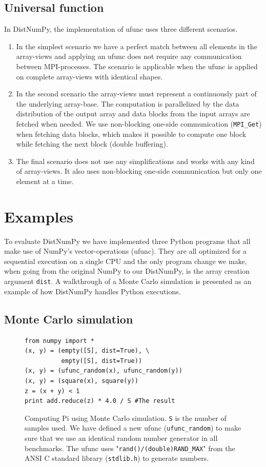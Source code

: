 \documentclass[10pt]{article}
\begin{document}
\subsection{Universal function}
In DistNumPy, the implementation of ufunc uses three different scenarios.
\begin{enumerate}
\item In the simplest scenario we have a perfect match between all elements in the array-views and applying an ufunc does not require any communication between MPI-processes. The scenario is applicable when the ufunc is applied on complete array-views with identical shapes.
\item In the second scenario the array-views must represent a continuously part of the underlying array-base. The computation is parallelized by the data distribution of the output array and data blocks from the input arrays are fetched when needed. We use non-blocking one-side communication (\texttt{MPI\_Get}) when fetching data blocks, which makes it possible to compute one block while fetching the next block (double buffering).
\item The final scenario does not use any simplifications and works with any kind of array-views. It also uses non-blocking one-side communication but only one element at a time.
\end{enumerate}


\section{Examples}
To evaluate DistNumPy we have implemented three Python programs that all make use of NumPy's vector-operations (ufunc). They are all optimized for a sequential execution on a single CPU and the only program change we make, when going from the original NumPy to our DistNumPy, is the array creation argument \texttt{dist}. 
A walkthrough of a Monte Carlo simulation is presented as an example of how DistNumPy handles Python executions.


\subsection{Monte Carlo simulation}
\begin{figure}
\begin{lstlisting}
from numpy import *
(x, y) = (empty([S], dist=True), \
		  empty([S], dist=True))
(x, y) = (ufunc_random(x), ufunc_random(y))
(x, y) = (square(x), square(y))
z = (x + y) < 1
print add.reduce(z) * 4.0 / S #The result
\end{lstlisting}
 \caption{Computing Pi using Monte Carlo simulation. \texttt{S} is the number of samples used. We have defined a new ufunc (\texttt{ufunc\_random}) to make sure that we use an identical random number generator in all benchmarks. The ufunc uses "\texttt{rand()/(double)RAND\_MAX}" from the ANSI C standard library (\texttt{stdlib.h}) to generate numbers.}
 \label{lst:montecarlo}
\end{figure}
\end{document}
